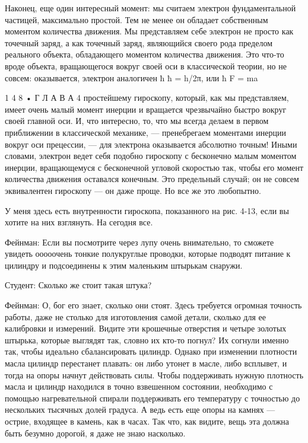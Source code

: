 \documentclass[10pt,oneside]{article}
\newcommand{\TipsSubsection}[1]{\par\vspace{6bp}{\normalsize\bfseries #1\par}\vspace{2bp}}
\begin{document}
Наконец, еще один интересный момент: мы считаем электрон фундаментальной частицей, максимально простой. Тем не менее он обладает собственным моментом количества движения. Мы представляем себе электрон не просто как точечный заряд, а как точечный заряд, являющийся своего рода пределом реального объекта, обладающего моментом количества движения. Это что-то вроде объекта, вращающегося вокруг своей оси в классической теории, но не совсем: оказывается, электрон аналогичен ħ ħ = h/2π, или ħ F = ma\par

1 4 8 • Г Л А В А  4 простейшему гироскопу, который, как мы представляем, имеет очень малый момент инерции и вращается чрезвычайно быстро вокруг своей главной оси. И, что интересно, то, что мы всегда делаем в первом приближении в классической механике, --- пренебрегаем моментами инерции вокруг оси прецессии, --- для электрона оказывается абсолютно точным! Иными словами, электрон ведет себя подобно гироскопу с бесконечно малым моментом инерции, вращающемуся с бесконечной угловой скоростью так, чтобы его момент количества движения оставался конечным. Это предельный случай; он не совсем эквивалентен гироскопу --- он даже проще. Но все же это любопытно.\par

У меня здесь есть внутренности гироскопа, показанного на рис. 4-13, если вы хотите на них взглянуть. На сегодня все.\par

\TipsSubsection{4-14 После лекции}

Фейнман: Если вы посмотрите через лупу очень внимательно, то сможете увидеть ооооочень тонкие полукруглые проводки, которые подводят питание к цилиндру и подсоединены к этим маленьким штырькам снаружи.\par

Студент: Сколько же стоит такая штука?\par

Фейнман: О, бог его знает, сколько они стоят. Здесь требуется огромная точность работы, даже не столько для изготовления самой детали, сколько для ее калибровки и измерений. Видите эти крошечные отверстия и четыре золотых штырька, которые выглядят так, словно их кто-то погнул? Их согнули именно так, чтобы идеально сбалансировать цилиндр. Однако при изменении плотности масла цилиндр перестанет плавать: он либо утонет в масле, либо всплывет, и тогда на опоры начнут действовать силы. Чтобы поддерживать нужную плотность масла и цилиндр находился в точно взвешенном состоянии, необходимо с помощью нагревательной спирали поддерживать его температуру с точностью до нескольких тысячных долей градуса. А ведь есть еще опоры на камнях --- острие, входящее в камень, как в часах. Так что, как видите, вещь эта должна быть безумно дорогой, я даже не знаю насколько.\par
\end{document}
